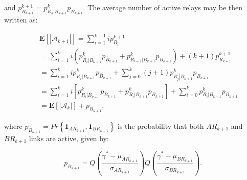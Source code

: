 \documentclass[12pt,draftcls, onecolumn]{IEEEtran}
\begin{document}
\noindent and $p^{k+1}_{R_{k+1}} {=} p^{k}_{\left.R_k\right|B_{k+1}}p_{B_{k+1}}$. The average number of active relays may be then written as: 



\begingroup

{\setlength{\arraycolsep}{0em}\begin{eqnarray}
&&\mathbf{E}\left[\left|\mathcal{A}_{k+1}\right|\right] =  \sum^{k+1}_{i=1}ip^{k+1}_{R_i}\nonumber\\
&&=\sum^{k}_{i=1}i\left(p^k_{\left.R_i\right|\overline{B}_{k+1}}p_{\overline{B}_{k+1}}+p^k_{\left.R_{i-1}\right|B_{k+1}}p_{B_{k+1}}\right)+(k+1)p^{k+1}_{R_{k+1}}\nonumber\\
&&=\sum^{k}_{i=1}ip^k_{\left.R_i\right|\overline{B}_{k+1}}p_{\overline{B}_{k+1}}+\sum^{k}_{j=0}(j+1)p^k_{\left.R_j\right|B_{k+1}}p_{B_{k+1}}\nonumber\\
&&=\sum^k_{i=1}i\left[p^k_{\left.R_i\right|\overline{B}_{k+1}}p_{\overline{B}_{k+1}}+p^k_{\left.R_i\right|B_{k+1}}p_{B_{k+1}}\right]+\sum^{k}_{i=0}p^k_{\left.R_i\right|B_{k+1}}p_{B_{k+1}}\nonumber\\
&&= \mathbf{E}\left[\left|\mathcal{A}_{k}\right|\right] + p_{B_{k+1}},
\end{eqnarray}}
\endgroup



\noindent where $p_{B_{k+1}} = Pr\left\{\boldsymbol{1}_{AR_{k+1}},\boldsymbol{1}_{BR_{k+1}}\right\}$ is the probability that both $AR_{k+1}$ and $BR_{k+1}$ links are active, given by:

\begin{equation}
p_{B_{k+1}} =  Q\left(\frac{\gamma^* - \mu_{AR_{k+1}}}{\sigma_{AR_{k+1}}}\right)Q\left(\frac{\gamma^* - \mu_{BR_{k+1}}}{\sigma_{BR_{k+1}}}\right).
\end{equation}

\ifCLASSOPTIONcaptionsoff
  \newpage
\fi




\end{document}
